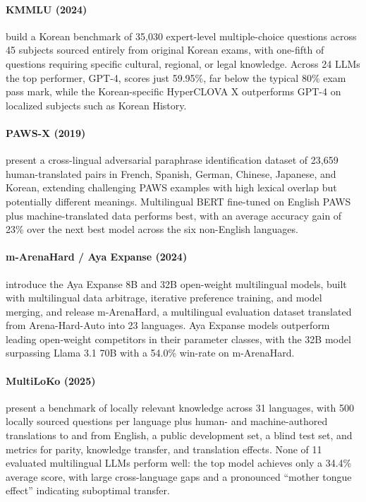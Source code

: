 \documentclass[letterpaper]{article}
\begin{document}
\paragraph{KMMLU (2024)} \citet{son2024kmmlu} build a Korean benchmark of 35,030 expert-level multiple-choice questions across 45 subjects sourced entirely from original Korean exams, with one-fifth of questions requiring specific cultural, regional, or legal knowledge. Across 24 LLMs the top performer, GPT-4, scores just 59.95\%, far below the typical 80\% exam pass mark, while the Korean-specific HyperCLOVA X outperforms GPT-4 on localized subjects such as Korean History.

\paragraph{PAWS-X (2019)} \citet{yang2019paws} present a cross-lingual adversarial paraphrase identification dataset of 23,659 human-translated pairs in French, Spanish, German, Chinese, Japanese, and Korean, extending challenging PAWS examples with high lexical overlap but potentially different meanings. Multilingual BERT fine-tuned on English PAWS plus machine-translated data performs best, with an average accuracy gain of 23\% over the next best model across the six non-English languages.

\paragraph{m-ArenaHard / Aya Expanse (2024)} \citet{dang2024aya} introduce the Aya Expanse 8B and 32B open-weight multilingual models, built with multilingual data arbitrage, iterative preference training, and model merging, and release m-ArenaHard, a multilingual evaluation dataset translated from Arena-Hard-Auto into 23 languages. Aya Expanse models outperform leading open-weight competitors in their parameter classes, with the 32B model surpassing Llama 3.1 70B with a 54.0\% win-rate on m-ArenaHard.

\paragraph{MultiLoKo (2025)} \citet{hupkes2025multiloko} present a benchmark of locally relevant knowledge across 31 languages, with 500 locally sourced questions per language plus human- and machine-authored translations to and from English, a public development set, a blind test set, and metrics for parity, knowledge transfer, and translation effects. None of 11 evaluated multilingual LLMs perform well: the top model achieves only a 34.4\% average score, with large cross-language gaps and a pronounced ``mother tongue effect'' indicating suboptimal transfer.
\end{document}
